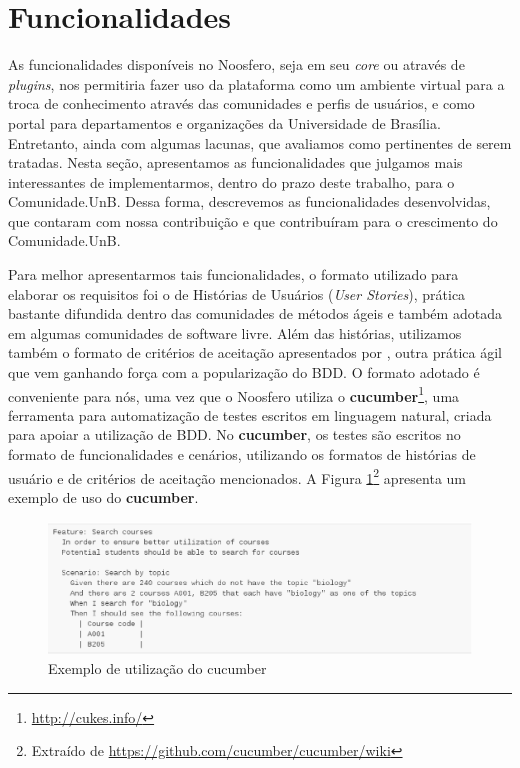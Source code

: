 \section{Funcionalidades}
\label{funcionalidades}

As funcionalidades disponíveis no Noosfero, seja em seu \textit{core}
ou através de \textit{plugins}, nos permitiria fazer uso da plataforma como
um ambiente virtual para a troca de conhecimento através das comunidades e
perfis de usuários, e como portal para departamentos e organizações da
Universidade de Brasília. Entretanto, ainda com algumas lacunas, que avaliamos
como pertinentes de serem tratadas.
%
Nesta seção, apresentamos as funcionalidades que julgamos mais interessantes
de implementarmos, dentro do prazo deste trabalho, para o Comunidade.UnB.
%
Dessa forma, descrevemos as funcionalidades desenvolvidas, que contaram com
nossa contribuição e que contribuíram para o crescimento do Comunidade.UnB.


Para melhor apresentarmos tais funcionalidades, o formato utilizado para
elaborar os requisitos foi o de Histórias de Usuários (\textit{User Stories}),
prática bastante difundida dentro das comunidades de métodos ágeis e também
adotada em algumas comunidades de software livre. 
%
Além das histórias, utilizamos também o formato de critérios de aceitação
apresentados por , outra
prática ágil que vem ganhando força com a popularização do BDD.
%
O formato adotado é conveniente para nós, uma vez que o Noosfero utiliza o
\textbf{cucumber}\footnote{\url{http://cukes.info/}}, uma ferramenta para
automatização de testes escritos em linguagem natural, criada para apoiar a
utilização de BDD. No \textbf{cucumber}, os testes são escritos no formato
de funcionalidades e cenários, utilizando os formatos de histórias de
usuário e de critérios de aceitação mencionados. A Figura
\ref{cucumber}\footnote{Extraído de \url{https://github.com/cucumber/cucumber/wiki}}
apresenta um exemplo de uso do \textbf{cucumber}.

\begin{figure}[h]
	\centering
	\includegraphics[keepaspectratio=true,scale=0.6]{figuras/cucumber_sample.eps}
	\caption{Exemplo de utilização do cucumber}
	\label{cucumber}
\end{figure}

